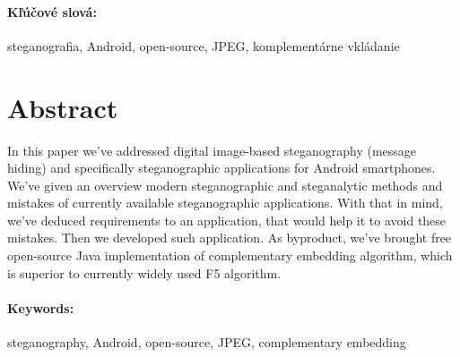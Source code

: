 \documentclass[12pt, oneside]{book}
\begin{document}
\paragraph*{Kľúčové slová:} steganografia, Android, open-source, JPEG, komplementárne vkládanie 


\newpage 
\section*{Abstract}

In this paper we've addressed digital image-based steganography (message hiding) and 
specifically steganographic applications for Android smartphones. We've given an overview modern
steganographic and steganalytic methods and mistakes of currently available steganographic
applications. With that in mind, we've deduced requirements to an application, that would
help it to avoid these mistakes. Then we developed such application. As byproduct, we've
brought free open-source Java implementation of complementary embedding algorithm, which
is superior to currently widely used F5 algorithm.


\paragraph*{Keywords:} steganography, Android, open-source, JPEG, complementary embedding



\newpage 

\tableofcontents



\newpage 

\listoffigures


\mainmatter





\end{document}

